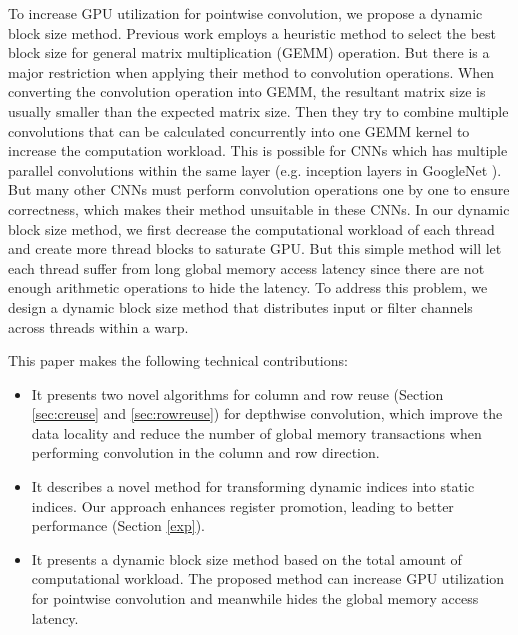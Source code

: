 To increase GPU utilization for pointwise convolution, we propose a dynamic block size method. 
Previous work \cite{li2019coordinated,pourghassemi2020limits} employs a heuristic method to select the best block size for general matrix multiplication (GEMM) operation. 
But there is a major restriction when applying their method to convolution operations.
When converting the convolution operation into GEMM, the resultant matrix size is usually smaller than the expected matrix size.
Then they try to combine multiple convolutions that can be calculated concurrently into one GEMM kernel to increase the computation workload.
This is possible for CNNs which has multiple parallel convolutions within the same layer (e.g. inception layers in GoogleNet \cite{szegedy2015going}).
But many other CNNs must perform convolution operations one by one to ensure correctness, which makes their method unsuitable in these CNNs.
In our dynamic block size method, we first decrease the computational workload of each thread and create more thread blocks to saturate GPU. 
But this simple method will let each thread suffer from long global memory access latency since there are not enough arithmetic operations to hide the latency.
To address this problem, we design a dynamic block size method that distributes input or filter channels across threads within a warp. 

This paper makes the following technical contributions:
\begin{itemize}
    \item It presents two novel algorithms for column and row reuse (Section \ref{sec:creuse} and \ref{sec:rowreuse}) for depthwise convolution, which improve the data locality and reduce the number of global memory transactions when performing convolution in the column and row direction.
    \item It describes a novel method for transforming dynamic indices into static indices. 
    Our approach enhances register promotion, leading to better performance (Section \ref{exp}).
    \item It presents a dynamic block size method based on the total amount of computational workload. The proposed method can increase GPU utilization for pointwise convolution and meanwhile hides the global memory access latency. 
\end{itemize}
